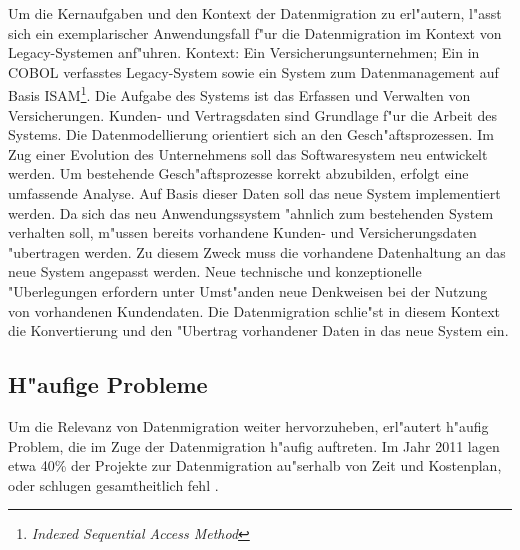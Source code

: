 Um die Kernaufgaben und den Kontext der Datenmigration zu erl"autern, l"asst sich ein exemplarischer Anwendungsfall f"ur die Datenmigration im Kontext von Legacy-Systemen anf"uhren.
\lb
Kontext:
Ein Versicherungsunternehmen; Ein in COBOL verfasstes Legacy-System sowie ein System zum Datenmanagement auf Basis ISAM\footnote{\textit{Indexed Sequential Access Method}}. Die Aufgabe des Systems ist das Erfassen und Verwalten von Versicherungen. Kunden- und Vertragsdaten sind Grundlage f"ur die Arbeit des Systems. Die Datenmodellierung orientiert sich an den Gesch"aftsprozessen. 
\lb
Im Zug einer Evolution des Unternehmens soll das Softwaresystem neu entwickelt werden. Um bestehende Gesch"aftsprozesse korrekt abzubilden, erfolgt eine umfassende Analyse. Auf Basis dieser Daten soll das neue System implementiert werden. Da sich das neu Anwendungssystem "ahnlich zum bestehenden System verhalten soll, m"ussen bereits vorhandene Kunden- und Versicherungsdaten "ubertragen werden. Zu diesem Zweck muss die vorhandene Datenhaltung an das neue System angepasst werden. Neue technische und konzeptionelle "Uberlegungen erfordern unter Umst"anden neue Denkweisen bei der Nutzung von vorhandenen Kundendaten. Die Datenmigration schlie"st in diesem Kontext die Konvertierung und den "Ubertrag vorhandener Daten in das neue System ein.

\subsection{H"aufige Probleme}

Um die Relevanz von Datenmigration weiter hervorzuheben, erl"autert \citep{morris-2012} h"aufig Problem, die im Zuge der Datenmigration h"aufig auftreten. Im Jahr 2011 lagen etwa 40\% der Projekte zur Datenmigration au"serhalb von Zeit und Kostenplan, oder schlugen gesamtheitlich fehl \citep{howard-2011}.

